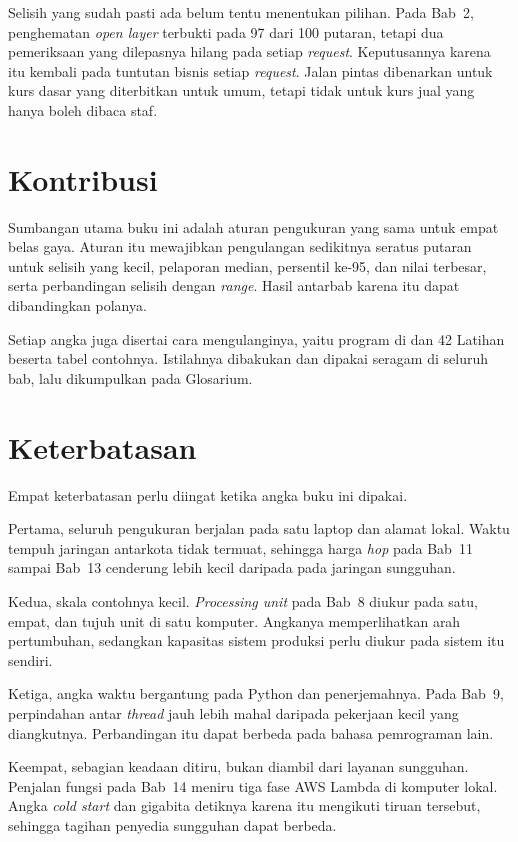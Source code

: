 Selisih yang sudah pasti ada belum tentu menentukan pilihan. Pada Bab~2,
penghematan \textit{open layer} terbukti pada 97 dari 100 putaran, tetapi dua
pemeriksaan yang dilepasnya hilang pada setiap \textit{request}. Keputusannya
karena itu kembali pada tuntutan bisnis setiap \textit{request}. Jalan pintas
dibenarkan untuk kurs dasar yang diterbitkan untuk umum, tetapi tidak untuk kurs
jual yang hanya boleh dibaca staf.

\section*{Kontribusi}

Sumbangan utama buku ini adalah aturan pengukuran yang sama untuk empat belas
gaya. Aturan itu mewajibkan pengulangan sedikitnya seratus putaran untuk
selisih yang kecil, pelaporan median, persentil ke-95, dan nilai terbesar, serta
perbandingan selisih dengan \textit{range}. Hasil antarbab karena itu dapat
dibandingkan polanya.

Setiap angka juga disertai cara mengulanginya, yaitu program di
 dan 42 Latihan beserta tabel contohnya. Istilahnya dibakukan
dan dipakai seragam di seluruh bab, lalu dikumpulkan pada Glosarium.

\section*{Keterbatasan}

Empat keterbatasan perlu diingat ketika angka buku ini dipakai.

Pertama, seluruh pengukuran berjalan pada satu laptop dan alamat lokal. Waktu
tempuh jaringan antarkota tidak termuat, sehingga harga \textit{hop} pada Bab~11
sampai Bab~13 cenderung lebih kecil daripada pada jaringan sungguhan.

Kedua, skala contohnya kecil. \textit{Processing unit} pada Bab~8 diukur pada
satu, empat, dan tujuh unit di satu komputer. Angkanya memperlihatkan arah
pertumbuhan, sedangkan kapasitas sistem produksi perlu diukur pada sistem itu
sendiri.

Ketiga, angka waktu bergantung pada Python dan penerjemahnya. Pada Bab~9,
perpindahan antar \textit{thread} jauh lebih mahal daripada pekerjaan kecil yang
diangkutnya. Perbandingan itu dapat berbeda pada bahasa pemrograman lain.

Keempat, sebagian keadaan ditiru, bukan diambil dari layanan sungguhan. Penjalan
fungsi pada Bab~14 meniru tiga fase AWS Lambda di komputer lokal. Angka
\textit{cold start} dan gigabita detiknya karena itu mengikuti tiruan tersebut,
sehingga tagihan penyedia sungguhan dapat berbeda.

